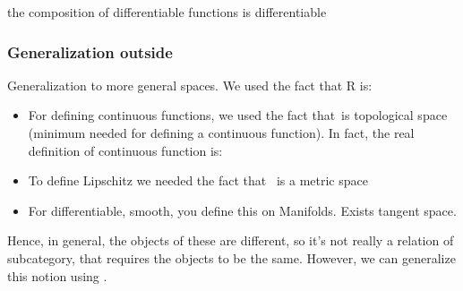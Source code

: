 {    \begin{example}
        the composition of differentiable functions is differentiable
    \end{example}


    \subsubsection{Generalization outside \reals}
    Generalization to more general spaces.
    We used the fact that R is:
    \begin{itemize}
        \item For defining continuous functions, we used the fact that~\reals is topological space (minimum needed for defining a continuous function).
              In fact, the real definition of continuous function is:


        \item To define Lipschitz we needed the fact that~ \reals is a metric space
        \item For differentiable, smooth, you define this on Manifolds.
              Exists tangent space.
    \end{itemize}

    Hence, in general, the objects of these are different, so it's not really a relation of subcategory, that requires the objects to be the same.
    However, we can generalize this notion using .

}

